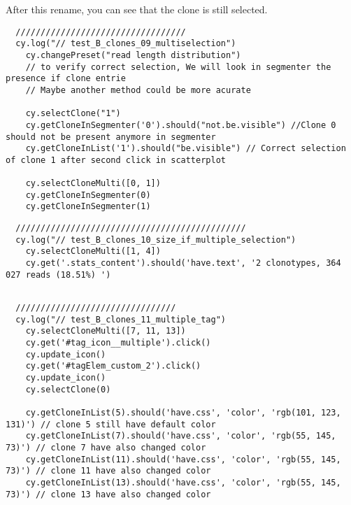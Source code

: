 \bigskip

After this rename, you can see that the clone is still selected.
\begin{verbatim}
  //////////////////////////////////
  cy.log("// test_B_clones_09_multiselection")
    cy.changePreset("read length distribution")
    // to verify correct selection, We will look in segmenter the presence if clone entrie
    // Maybe another method could be more acurate

    cy.selectClone("1")
    cy.getCloneInSegmenter('0').should("not.be.visible") //Clone 0 should not be present anymore in segmenter
    cy.getCloneInList('1').should("be.visible") // Correct selection of clone 1 after second click in scatterplot

    cy.selectCloneMulti([0, 1])
    cy.getCloneInSegmenter(0)
    cy.getCloneInSegmenter(1)

\end{verbatim}

\begin{verbatim}
  //////////////////////////////////////////////
  cy.log("// test_B_clones_10_size_if_multiple_selection")
    cy.selectCloneMulti([1, 4])
    cy.get('.stats_content').should('have.text', '2 clonotypes, 364 027 reads (18.51%) ')


\end{verbatim}

\begin{verbatim}
  ////////////////////////////////
  cy.log("// test_B_clones_11_multiple_tag")
    cy.selectCloneMulti([7, 11, 13])
    cy.get('#tag_icon__multiple').click()
    cy.update_icon()
    cy.get('#tagElem_custom_2').click()
    cy.update_icon()
    cy.selectClone(0)

    cy.getCloneInList(5).should('have.css', 'color', 'rgb(101, 123, 131)') // clone 5 still have default color
    cy.getCloneInList(7).should('have.css', 'color', 'rgb(55, 145, 73)') // clone 7 have also changed color
    cy.getCloneInList(11).should('have.css', 'color', 'rgb(55, 145, 73)') // clone 11 have also changed color
    cy.getCloneInList(13).should('have.css', 'color', 'rgb(55, 145, 73)') // clone 13 have also changed color


\end{verbatim}

